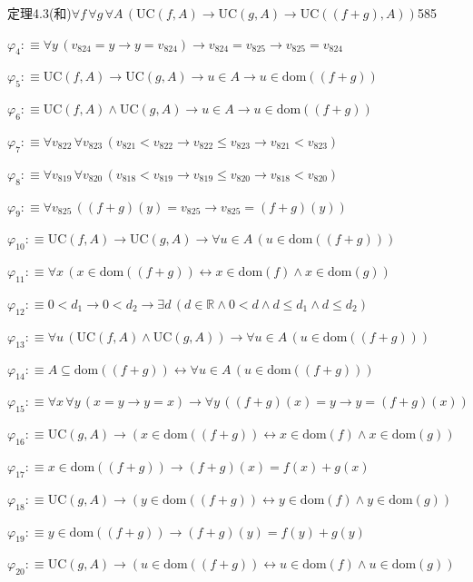 \begin{fullproof}{定理4.3(和)}{$\forall f\,\forall g\,\forall A\,(\mathrm{UC}(f,A) \to \mathrm{UC}(g,A) \to \mathrm{UC}((f + g),A))$}{585}
\begin{abbrevlist}
\item $\varphi_{4} :\equiv \forall y\,(v_{824} = y \to y = v_{824}) \to v_{824} = v_{825} \to v_{825} = v_{824}$
\item $\varphi_{5} :\equiv \mathrm{UC}(f,A) \to \mathrm{UC}(g,A) \to u \in A \to u \in \mathrm{dom}((f + g))$
\item $\varphi_{6} :\equiv \mathrm{UC}(f,A) \land \mathrm{UC}(g,A) \to u \in A \to u \in \mathrm{dom}((f + g))$
\item $\varphi_{7} :\equiv \forall v_{822}\,\forall v_{823}\,(v_{821} < v_{822} \to v_{822} \leq v_{823} \to v_{821} < v_{823})$
\item $\varphi_{8} :\equiv \forall v_{819}\,\forall v_{820}\,(v_{818} < v_{819} \to v_{819} \leq v_{820} \to v_{818} < v_{820})$
\item $\varphi_{9} :\equiv \forall v_{825}\,((f + g)(y) = v_{825} \to v_{825} = (f + g)(y))$
\item $\varphi_{10} :\equiv \mathrm{UC}(f,A) \to \mathrm{UC}(g,A) \to \forall u \in A\,(u \in \mathrm{dom}((f + g)))$
\item $\varphi_{11} :\equiv \forall x\,(x \in \mathrm{dom}((f + g)) \leftrightarrow x \in \mathrm{dom}(f) \land x \in \mathrm{dom}(g))$
\item $\varphi_{12} :\equiv 0 < d_{1} \to 0 < d_{2} \to \exists d\,(d \in \mathbb{R} \land 0 < d \land d \leq d_{1} \land d \leq d_{2})$
\item $\varphi_{13} :\equiv \forall u\,(\mathrm{UC}(f,A) \land \mathrm{UC}(g,A)) \to \forall u \in A\,(u \in \mathrm{dom}((f + g)))$
\item $\varphi_{14} :\equiv A \subseteq \mathrm{dom}((f + g)) \leftrightarrow \forall u \in A\,(u \in \mathrm{dom}((f + g)))$
\item $\varphi_{15} :\equiv \forall x\,\forall y\,(x = y \to y = x) \to \forall y\,((f + g)(x) = y \to y = (f + g)(x))$
\item $\varphi_{16} :\equiv \mathrm{UC}(g,A) \to (x \in \mathrm{dom}((f + g)) \leftrightarrow x \in \mathrm{dom}(f) \land x \in \mathrm{dom}(g))$
\item $\varphi_{17} :\equiv x \in \mathrm{dom}((f + g)) \to (f + g)(x) = f(x) + g(x)$
\item $\varphi_{18} :\equiv \mathrm{UC}(g,A) \to (y \in \mathrm{dom}((f + g)) \leftrightarrow y \in \mathrm{dom}(f) \land y \in \mathrm{dom}(g))$
\item $\varphi_{19} :\equiv y \in \mathrm{dom}((f + g)) \to (f + g)(y) = f(y) + g(y)$
\item $\varphi_{20} :\equiv \mathrm{UC}(g,A) \to (u \in \mathrm{dom}((f + g)) \leftrightarrow u \in \mathrm{dom}(f) \land u \in \mathrm{dom}(g))$

\end{abbrevlist}
\end{fullproof}

